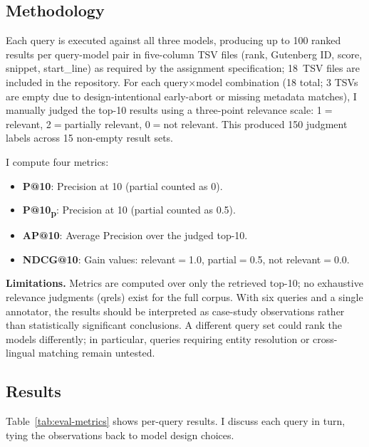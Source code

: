 \documentclass[sigconf,nonacm]{acmart}
\begin{document}
\subsection{Methodology}
Each query is executed against all three models, producing up to 100 ranked
results per query-model pair in five-column TSV files (rank, Gutenberg ID,
score, snippet, start\_line) as required by the assignment specification;
18~TSV files are included in the repository.
For each query$\times$model combination (18 total; 3 TSVs are empty due to
design-intentional early-abort or missing metadata matches), I manually judged
the top-10 results using a three-point relevance scale: 1$=$relevant,
2$=$partially relevant, 0$=$not relevant.  This produced 150 judgment labels
across 15 non-empty result sets.

I compute four metrics:
\begin{itemize}[nosep]
  \item \textbf{P@10}: Precision at 10 (partial counted as 0).
  \item \textbf{P@10\textsubscript{p}}: Precision at 10 (partial counted as 0.5).
  \item \textbf{AP@10}: Average Precision over the judged top-10.
  \item \textbf{NDCG@10}: Gain values: relevant$=$1.0, partial$=$0.5,
        not relevant$=$0.0.
\end{itemize}

\textbf{Limitations.}  Metrics are computed over only the retrieved top-10; no
exhaustive relevance judgments (qrels) exist for the full corpus.  With six
queries and a single annotator, the results should be interpreted as case-study
observations rather than statistically significant conclusions.  A different
query set could rank the models differently; in particular, queries requiring
entity resolution or cross-lingual matching remain untested.

\subsection{Results}



Table~\ref{tab:eval-metrics} shows per-query results.  I discuss each query in
turn, tying the observations back to model design choices.
\end{document}
